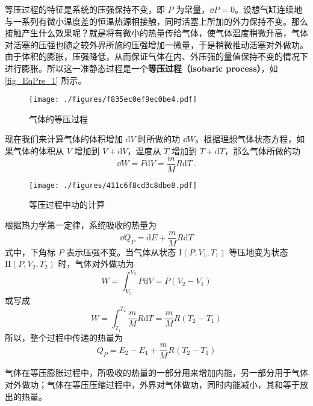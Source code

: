 

等压过程的特征是系统的压强保持不变，即 $P$ 为常量，$\dd P =0$。设想气缸连续地与一系列有微小温度差的恒温热源相接触，同时活塞上所加的外力保持不变。那么接触产生什么效果呢？就是将有微小的热量传给气体，使气体温度稍微升高，气体对活塞的压强也随之较外界所施的压强增加一微量，于是稍微推动活塞对外做功。由于体积的膨胀，压强降低，从而保证气体在内、外压强的量值保持不变的情况下进行膨胀。所以这一准静态过程是一个\textbf{等压过程（isobaric process）}，如\autoref{fig_EqPre_1} 所示。
\begin{figure}[ht]
\centering
\texttt{[image: ./figures/f835ec0ef9ec0be4.pdf]}
\caption{气体的等压过程} \label{fig_EqPre_1}
\end{figure}
现在我们来计算气体的体积增加 $\mathrm d V $ 时所做的功 $\dd W$。根据理想气体状态方程，如果气体的体积从 $V $ 增加到 $V+\mathrm dV$，温度从 $T $ 增加到 $T+\mathrm dT$，那么气体所做的功
\begin{equation}
\dd W=P \mathrm{d} V=\frac{m}{M} R \mathrm{d} T~.
\end{equation}
\begin{figure}[ht]
\centering
\texttt{[image: ./figures/411c6f8cd3c8dbe8.pdf]}
\caption{等压过程中功的计算} \label{fig_EqPre_2}
\end{figure}
根据热力学第一定律，系统吸收的热量为
\begin{equation}
\dd Q_{P}=\mathrm{d} E+\frac{m}{M} R \mathrm{d} T
\end{equation}
式中，下角标 $P$ 表示压强不变。当气体从状态 $\mathrm I(P, V_1, T_1)$ 等压地变为状态 $\mathrm{II}(P, V_2,T_2)$ 时，气体对外做功为
\begin{equation}
W=\int_{V_{1}}^{V_{2}} P \mathrm{d} V=P\left(V_{2}-V_{1}\right)
\end{equation}
或写成
\begin{equation}
W=\int_{T_{1}}^{T_{2}} \frac{m}{M} R \mathrm{d} T=\frac{m}{M} R\left(T_{2}-T_{1}\right)
\end{equation}
所以，整个过程中传递的热量为
\begin{equation}
Q_{P}=E_{2}-E_{1}+\frac{m}{M} R\left(T_{2}-T_{1}\right)
\end{equation}

气体在等压膨胀过程中，所吸收的热量的一部分用来增加内能，另一部分用于气体对外做功；气体在等压压缩过程中，外界对气体做功，同时内能减小，其和等于放出的热量。

